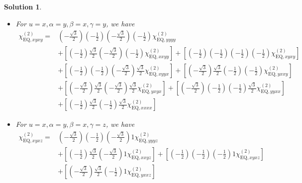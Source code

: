 \documentclass[UTF8,10pt,a4paper]{article}
\theoremstyle{Problem}
\theoremstyle{Solution}
\newtheorem*{sol}{Solution}
\begin{document}
\begin{sol}
\begin{itemize}
\begin{align}
&+\left[\left(-\frac{1}{2}\right)\frac{\sqrt{3}}{2}\left(-\frac{1}{2}\right)\left(-\frac{1}{2}\right)\chi_{\text{EQ},xxxx}^{(2)}\right]
\end{align}\normalsize
\item For $u=x,\alpha=y,\beta=x,\gamma=y$, we have
\footnotesize\begin{align}
\nonumber\chi_{\text{EQ},xyxy}^{(2)}=&\left(-\frac{\sqrt{3}}{2}\right)\left(-\frac{1}{2}\right)\left(-\frac{\sqrt{3}}{2}\right)\left(-\frac{1}{2}\right)\chi_{\text{EQ},yyyy}^{(2)}\\
\nonumber&+\left[\left(-\frac{1}{2}\right)\frac{\sqrt{3}}{2}\left(-\frac{\sqrt{3}}{2}\right)\left(-\frac{1}{2}\right)\chi_{\text{EQ},xxyy}^{(2)}\right]+\left[\left(-\frac{1}{2}\right)\left(-\frac{1}{2}\right)\left(-\frac{1}{2}\right)\left(-\frac{1}{2}\right)\chi_{\text{EQ},xyxy}^{(2)}\right]\\
\nonumber&+\left[\left(-\frac{1}{2}\right)\left(-\frac{1}{2}\right)\left(-\frac{\sqrt{3}}{2}\right)\frac{\sqrt{3}}{2}\chi_{\text{EQ},xyyx}^{(2)}\right]+\left[\left(-\frac{\sqrt{3}}{2}\right)\frac{\sqrt{3}}{2}\left(-\frac{1}{2}\right)\left(-\frac{1}{2}\right)\chi_{\text{EQ},yxxy}^{(2)}\right]\\
\nonumber&+\left[\left(-\frac{\sqrt{3}}{2}\right)\frac{\sqrt{3}}{2}\left(-\frac{\sqrt{3}}{2}\right)\frac{\sqrt{3}}{2}\chi_{\text{EQ},yxyx}^{(2)}\right]+\left[\left(-\frac{\sqrt{3}}{2}\right)\left(-\frac{1}{2}\right)\left(-\frac{1}{2}\right)\frac{\sqrt{3}}{2}\chi_{\text{EQ},yyxx}^{(2)}\right]\\
&+\left[\left(-\frac{1}{2}\right)\frac{\sqrt{3}}{2}\left(-\frac{1}{2}\right)\frac{\sqrt{3}}{2}\chi_{\text{EQ},xxxx}^{(2)}\right]
\end{align}\normalsize
\item For $u=x,\alpha=y,\beta=x,\gamma=z$, we have
\footnotesize\begin{align}
\nonumber\chi_{\text{EQ},xyxz}^{(2)}=&\left(-\frac{\sqrt{3}}{2}\right)\left(-\frac{1}{2}\right)\left(-\frac{\sqrt{3}}{2}\right)1\chi_{\text{EQ},yyyz}^{(2)}\\
\nonumber&+\left[\left(-\frac{1}{2}\right)\frac{\sqrt{3}}{2}\left(-\frac{\sqrt{3}}{2}\right)1\chi_{\text{EQ},xxyz}^{(2)}\right]+\left[\left(-\frac{1}{2}\right)\left(-\frac{1}{2}\right)\left(-\frac{1}{2}\right)1\chi_{\text{EQ},xyxz}^{(2)}\right]\\
\nonumber&+\left[\left(-\frac{\sqrt{3}}{2}\right)\frac{\sqrt{3}}{2}\left(-\frac{1}{2}\right)1\chi_{\text{EQ},yxxz}^{(2)}\right]\\
\nonumber&\\

\end{align}
\end{itemize}
\end{sol}
\end{document}
